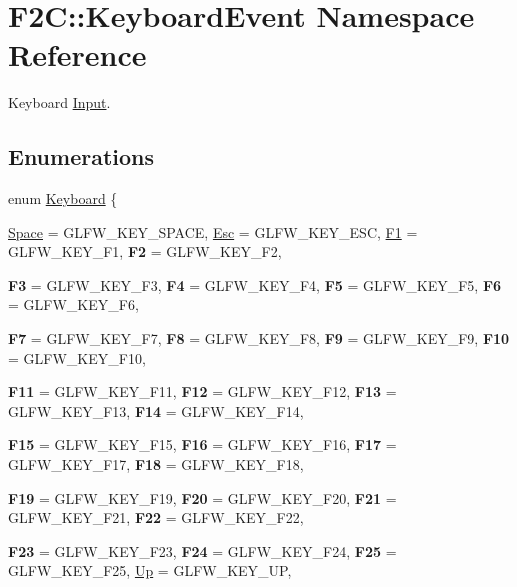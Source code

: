 \hypertarget{namespace_f2_c_1_1_keyboard_event}{
\section{F2C::KeyboardEvent Namespace Reference}
\label{namespace_f2_c_1_1_keyboard_event}
}


Keyboard \hyperlink{class_f2_c_1_1_input}{Input}.  
\subsection*{Enumerations}
\begin{DoxyCompactItemize}
\item 
enum \hyperlink{namespace_f2_c_1_1_keyboard_event_a13172bec547dc5eb2eee6c4fcd64c486}{Keyboard} \{ \par
\hyperlink{namespace_f2_c_1_1_keyboard_event_a13172bec547dc5eb2eee6c4fcd64c486abfbf4c69475e5e85d97f73764fedc78b}{Space} =  GLFW\_\-KEY\_\-SPACE, 
\hyperlink{namespace_f2_c_1_1_keyboard_event_a13172bec547dc5eb2eee6c4fcd64c486ae3b6c619f4caf0910faeb81347700a37}{Esc} =  GLFW\_\-KEY\_\-ESC, 
\hyperlink{namespace_f2_c_1_1_keyboard_event_a13172bec547dc5eb2eee6c4fcd64c486a31aa6109d979898ff66615a1405537dc}{F1} =  GLFW\_\-KEY\_\-F1, 
{\bfseries F2} =  GLFW\_\-KEY\_\-F2, 
\par
{\bfseries F3} =  GLFW\_\-KEY\_\-F3, 
{\bfseries F4} =  GLFW\_\-KEY\_\-F4, 
{\bfseries F5} =  GLFW\_\-KEY\_\-F5, 
{\bfseries F6} =  GLFW\_\-KEY\_\-F6, 
\par
{\bfseries F7} =  GLFW\_\-KEY\_\-F7, 
{\bfseries F8} =  GLFW\_\-KEY\_\-F8, 
{\bfseries F9} =  GLFW\_\-KEY\_\-F9, 
{\bfseries F10} =  GLFW\_\-KEY\_\-F10, 
\par
{\bfseries F11} =  GLFW\_\-KEY\_\-F11, 
{\bfseries F12} =  GLFW\_\-KEY\_\-F12, 
{\bfseries F13} =  GLFW\_\-KEY\_\-F13, 
{\bfseries F14} =  GLFW\_\-KEY\_\-F14, 
\par
{\bfseries F15} =  GLFW\_\-KEY\_\-F15, 
{\bfseries F16} =  GLFW\_\-KEY\_\-F16, 
{\bfseries F17} =  GLFW\_\-KEY\_\-F17, 
{\bfseries F18} =  GLFW\_\-KEY\_\-F18, 
\par
{\bfseries F19} =  GLFW\_\-KEY\_\-F19, 
{\bfseries F20} =  GLFW\_\-KEY\_\-F20, 
{\bfseries F21} =  GLFW\_\-KEY\_\-F21, 
{\bfseries F22} =  GLFW\_\-KEY\_\-F22, 
\par
{\bfseries F23} =  GLFW\_\-KEY\_\-F23, 
{\bfseries F24} =  GLFW\_\-KEY\_\-F24, 
{\bfseries F25} =  GLFW\_\-KEY\_\-F25, 
\hyperlink{namespace_f2_c_1_1_keyboard_event_a13172bec547dc5eb2eee6c4fcd64c486ac98c514d729af1c9d90852cf3c578675}{Up} =  GLFW\_\-KEY\_\-UP, 

\end{DoxyCompactItemize}
